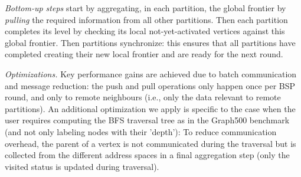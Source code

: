 \documentclass{llncs}
\begin{document}
\textit{Bottom-up steps} start by aggregating, in each partition, the global frontier by \textit{pulling} the required information from all other partitions. Then each partition completes its level by checking its local not-yet-activated vertices against this global frontier. Then partitions synchronize: this ensures that all partitions have completed creating their new local frontier and are ready for the next round.

\textit{Optimizations.} Key performance gains are achieved due to batch communication and message reduction: the push and pull operations only happen once per BSP round, and only to remote neighbours (i.e., only the data relevant to remote partitions). An additional optimization we apply is specific to the case when the user requires computing the BFS traversal tree as in the Graph500 benchmark (and not only labeling nodes with their 'depth'): To reduce communication overhead, the parent of a vertex is not communicated during the traversal but is collected from the different address spaces in a final aggregation step (only the visited status is updated during traversal).\\
\end{document}
